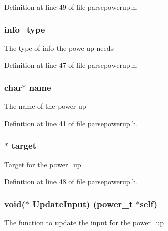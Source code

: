 Definition at line 49 of file parsepowerup.\+h.

\subsubsection[{\texorpdfstring{info\+\_\+type}{info_type}}]{ info\+\_\+type}\hypertarget{structpower__s_a92e471ab75337ebde8ffbddf14890542}{}\label{structpower__s_a92e471ab75337ebde8ffbddf14890542}
The type of info the powe up needs 

Definition at line 47 of file parsepowerup.\+h.

\subsubsection[{\texorpdfstring{name}{name}}]{\setlength{\rightskip}{0pt plus 5cm}char$\ast$ name}\hypertarget{structpower__s_a5ac083a645d964373f022d03df4849c8}{}\label{structpower__s_a5ac083a645d964373f022d03df4849c8}
The name of the power up 

Definition at line 41 of file parsepowerup.\+h.

\subsubsection[{\texorpdfstring{target}{target}}]{$\ast$ target}\hypertarget{structpower__s_a6729e2052b01af694ccadb9c401b57a0}{}\label{structpower__s_a6729e2052b01af694ccadb9c401b57a0}
Target for the power\+\_\+up 

Definition at line 48 of file parsepowerup.\+h.

\subsubsection[{\texorpdfstring{Update\+Input}{UpdateInput}}]{\setlength{\rightskip}{0pt plus 5cm}void($\ast$ Update\+Input) ({\bf power\+\_\+t} $\ast$self)}\hypertarget{structpower__s_a99fd6ee1c03eaf0de0f3e2c71237db69}{}\label{structpower__s_a99fd6ee1c03eaf0de0f3e2c71237db69}
The function to update the input for the power\+\_\+up 


